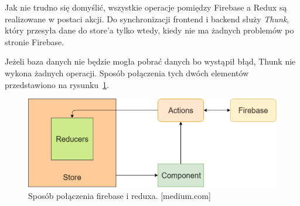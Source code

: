 Jak nie trudno się domyślić, wszystkie operacje pomiędzy Firebase a Redux są realizowane w postaci akcji.
Do synchronizacji frontend i backend służy \textit{Thunk},
który przesyła dane do store’a tylko wtedy,
kiedy nie ma żadnych problemów po stronie Firebase.

Jeżeli baza danych nie będzie mogła pobrać danych bo wystąpił błąd,
Thunk nie wykona żadnych operacji. Sposób połączenia tych dwóch elementów przedstawiono
na rysunku~\ref{rys:fireRedux}.

\begin{figure}
	\centering\includegraphics[width=.6\textwidth]{img/fireRedux}
	\caption{Sposób połączenia firebase i reduxa. [medium.com]}\label{rys:fireRedux}%
\end{figure}
